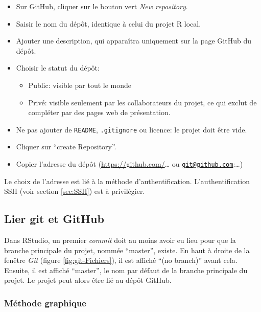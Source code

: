 \documentclass[
  12pt,
  french,
  a4paper,
  extrafontsizes,onecolumn,openright
  ]{memoir}
\providecommand{\tightlist}{%
  \setlength{\itemsep}{0pt}\setlength{\parskip}{0pt}}
\begin{document}
\begin{itemize}
\tightlist
\item
  Sur GitHub, cliquer sur le bouton vert \emph{New repository}.
\item
  Saisir le nom du dépôt, identique à celui du projet R local.
\item
  Ajouter une description, qui apparaîtra uniquement sur la page GitHub du dépôt.
\item
  Choisir le statut du dépôt:

  \begin{itemize}
  \tightlist
  \item
    Public: visible par tout le monde
  \item
    Privé: visible seulement par les collaborateurs du projet, ce qui exclut de compléter par des pages web de présentation.
  \end{itemize}
\item
  Ne pas ajouter de \texttt{README}, \texttt{.gitignore} ou licence: le projet doit être vide.
\item
  Cliquer sur \enquote{create Repository}.
\item
  Copier l'adresse du dépôt (\url{https://github.com/}\ldots{} ou \href{mailto:git@github.com}{\nolinkurl{git@github.com}}:\ldots)
\end{itemize}

Le choix de l'adresse est lié à la méthode d'authentification.
L'authentification SSH (voir section \ref{sec:SSH}) est à privilégier.

\hypertarget{lier-git-et-github}{%
\subsection{Lier git et GitHub}\label{lier-git-et-github}}

Dans RStudio, un premier \emph{commit} doit au moins avoir eu lieu pour que la branche principale du projet, nommée \enquote{master}, existe.
En haut à droite de la fenêtre \emph{Git} (figure \ref{fig:git-Fichiers}), il est affiché \enquote{(no branch)} avant cela.
Ensuite, il est affiché \enquote{master}, le nom par défaut de la branche principale du projet.
Le projet peut alors être lié au dépôt GitHub.

\hypertarget{muxe9thode-graphique}{%
\subsubsection{Méthode graphique}\label{muxe9thode-graphique}}
\end{document}
